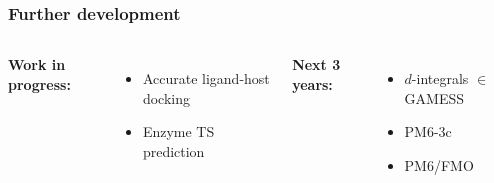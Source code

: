 \documentclass[12pt]{beamer}
\begin{document}
\begin{frame}
    \frametitle{Further development}

    
    \begin{columns}[t]

            {\bf Work in progress: }

            \begin{itemize}

                \item Accurate ligand-host docking

                \item Enzyme TS prediction

            \end{itemize}


            {\bf Next 3 years: }

            \begin{itemize}

                \item $d$-integrals $\in$ GAMESS

                \item PM6-3c
                \item PM6/FMO

            \end{itemize}

    \end{columns}

\end{frame}
\end{document}
